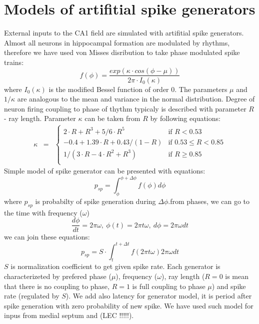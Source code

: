 \documentclass[a4paper,12pt]{article}
\begin{document}
\section{Models of artifitial spike generators}
External inputs to the CA1 field are simulated with artifitial spike generators. Almost all neurons in hippocampal formation are modulated by rhythms, therefore we have used von Misses disribution to take phase modulated spike trains:
\begin{equation}
f(\phi) = \frac{exp(\kappa \cdot cos(\phi - \mu) )  }{2\pi \cdot I_0(\kappa) }
\end{equation}
where $I_0(\kappa)$ is the modified Bessel function of order 0. The parameters $\mu$ and $1/\kappa$  are analogous to the mean and variance in the normal distribution. Degree of neuron firing coupling to phase of thythm typicaly is described with parameter $R$ - ray length. Parameter $\kappa$ can be taken from $R$ by following equations: 
\begin{equation}
\begin{matrix}
\kappa & = & \left\{
	\begin{matrix}
	2 \cdot R + R^3 + 5/6 \cdot R^5 & \mbox{if } R < 0.53 \\
	-0.4 + 1.39 \cdot R + 0.43 / (1 - R) & \mbox{if } 0.53 \leq   R < 0.85  \\
	1 / (3\cdot R - 4\cdot R^2 + R^3) & \mbox{if } R \geq 0.85 \\
	\end{matrix} \right.
\end{matrix}
\end{equation}
Simple model of spike generator can be presented with equations:
\begin{equation}
\label{eq:spike_prob_phases}
p_{sp} = \int_\phi^{\phi + \Delta \phi} f(\phi) d \phi
\end{equation}
where $p_{sp}$ is probabilty of spike generation during $\Delta \phi$.from phases, we can go to the time with frequency ($\omega$)
\begin{equation}
\frac{d \phi}{dt} = 2 \pi \omega, \ \phi(t)=2\pi t \omega, \ d\phi=2 \pi \omega dt
\end{equation}
we can join these equations:
\begin{equation}
p_{sp} = S \cdot \int_t^{t + \Delta t} f(2\pi t \omega) 2 \pi \omega dt
\end{equation}
$S$ is normalization coefficient to get given spike rate. Each generator is characterizeted by prefered phase ($\mu$), frequency ($\omega$), ray length ($R=0$ is mean that there is no coupling to phase, $R=1$ is full coupling to phase $\mu$) and spike rate (regulated by $S$). We add also latency for generator model, it is period after spike generation with zero probability of new spike. We have used such model for inpus from medial septum and (LEC !!!!!). \par
\end{document}
